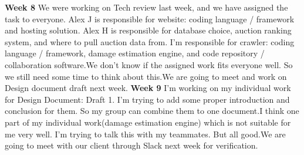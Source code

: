 \documentclass[onecolumn, draftclsnofoot, 10pt, compsoc]{IEEEtran}
\begin{document}
\textbf{Week 8}
We were working on  Tech review last week, and we have assigned the task to everyone.  Alex J is responsible for website: coding language / framework and  hosting solution. Alex H is responsible for database choice, auction ranking system, and where to pull auction data from. I'm responsible for crawler: coding language / framework, damage estimation engine, and code repository / collaboration software.We don't know if the assigned work fits everyone well. So we still need some time to think about this.We are going to meet and work on Design document draft next week.
\newline
\textbf{Week 9}
I'm working on my individual work for Design Document: Draft 1. I'm trying to add some proper introduction and conclusion for them. So my group can combine them to one document.I think one part of my individual work(damage estimation engine) which is not suitable for me very well. I'm trying to talk this with my teammates. But all good.We are going to meet with our client through Slack next week for verification.
\end{document}

